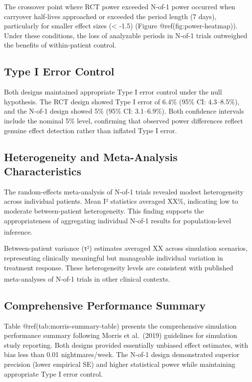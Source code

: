 \documentclass[
  11pt,
]{article}
\begin{document}
The crossover point where RCT power exceeded N-of-1 power occurred when
carryover half-lives approached or exceeded the period length (7 days),
particularly for smaller effect sizes (\textless{} -1.5) (Figure
@ref(fig:power-heatmap)). Under these conditions, the loss of analyzable
periods in N-of-1 trials outweighed the benefits of within-patient
control.

\subsection{Type I Error Control}\label{type-i-error-control}

Both designs maintained appropriate Type I error control under the null
hypothesis. The RCT design showed Type I error of 6.4\% (95\% CI:
4.3--8.5\%), and the N-of-1 design showed 5\% (95\% CI: 3.1--6.9\%).
Both confidence intervals include the nominal 5\% level, confirming that
observed power differences reflect genuine effect detection rather than
inflated Type I error.

\subsection{Heterogeneity and Meta-Analysis
Characteristics}\label{heterogeneity-and-meta-analysis-characteristics}

The random-effects meta-analysis of N-of-1 trials revealed modest
heterogeneity across individual patients. Mean I² statistics averaged
XX\%, indicating low to moderate between-patient heterogeneity. This
finding supports the appropriateness of aggregating individual N-of-1
results for population-level
inference\textsuperscript{}.

Between-patient variance (τ²) estimates averaged XX across simulation
scenarios, representing clinically meaningful but manageable individual
variation in treatment response. These heterogeneity levels are
consistent with published meta-analyses of N-of-1 trials in other
clinical
contexts\textsuperscript{}.

\subsection{Comprehensive Performance
Summary}\label{comprehensive-performance-summary}

Table @ref(tab:morris-summary-table) presents the comprehensive
simulation performance summary following Morris et al.~(2019) guidelines
for simulation study reporting. Both designs provided essentially
unbiased effect estimates, with bias less than 0.01 nightmares/week. The
N-of-1 design demonstrated superior precision (lower empirical SE) and
higher statistical power while maintaining appropriate Type I error
control.
\end{document}
